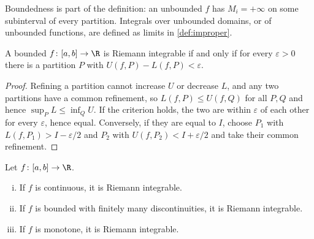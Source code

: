 Boundedness is part of the definition: an unbounded $f$ has $M_i=+\infty$ on some
subinterval of every partition. Integrals over unbounded domains, or of unbounded
functions, are defined as limits in \autoref{def:improper}.

\begin{proposition}\label{prop:riemann-criterion}
	A bounded $f\colon[a,b]\to\R$ is Riemann integrable if and only if for every
	$\varepsilon>0$ there is a partition $P$ with $U(f,P)-L(f,P)<\varepsilon$.
\end{proposition}

\begin{proof}
	Refining a partition cannot increase $U$ or decrease $L$, and any two partitions
	have a common refinement, so $L(f,P)\leq U(f,Q)$ for all $P,Q$ and hence
	$\sup_PL\leq\inf_QU$. If the criterion holds, the two are within
	$\varepsilon$ of each other for every $\varepsilon$, hence equal. Conversely, if
	they are equal to $I$, choose $P_1$ with $L(f,P_1)>I-\varepsilon/2$ and $P_2$
	with $U(f,P_2)<I+\varepsilon/2$ and take their common refinement.
\end{proof}

\begin{proposition}\label{prop:integrable}
	Let $f\colon[a,b]\to\R$.
	\begin{enumerate}[(i)]
		\item If $f$ is continuous, it is Riemann integrable.
		\item If $f$ is bounded with finitely many discontinuities, it is Riemann
		      integrable.
		\item If $f$ is monotone, it is Riemann integrable.
	\end{enumerate}
\end{proposition}

